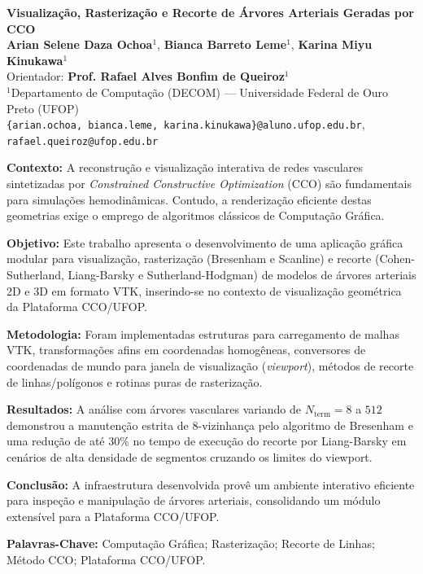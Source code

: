 \documentclass[11pt, a4paper]{article}
\begin{document}
\begin{center}
  {\LARGE \bfseries \textcolor{ufopred}{Visualização, Rasterização e Recorte de Árvores Arteriais Geradas por CCO}}\\[0.4cm]
  {\large \textbf{Arian Selene Daza Ochoa}$^{1}$, \textbf{Bianca Barreto Leme}$^{1}$, \textbf{Karina Miyu Kinukawa}$^{1}$}\\[0.1cm]
  {\small Orientador: \textbf{Prof. Rafael Alves Bonfim de Queiroz}$^{1}$}\\[0.2cm]
  {\small $^{1}$Departamento de Computação (DECOM) --- Universidade Federal de Ouro Preto (UFOP)\\[0.1cm]
  \texttt{\{arian.ochoa, bianca.leme, karina.kinukawa\}@aluno.ufop.edu.br}, \texttt{rafael.queiroz@ufop.edu.br}}\\[0.4cm]
\end{center}

\begin{tcolorbox}[colback=lightgray, colframe=deepnavy, arc=3pt, title=\textbf{RESUMO}, fonttitle=\bfseries]
\small
\textbf{Contexto:} A reconstrução e visualização interativa de redes vasculares sintetizadas por \textit{Constrained Constructive Optimization} (CCO) são fundamentais para simulações hemodinâmicas. Contudo, a renderização eficiente destas geometrias exige o emprego de algoritmos clássicos de Computação Gráfica. 

\textbf{Objetivo:} Este trabalho apresenta o desenvolvimento de uma aplicação gráfica modular para visualização, rasterização (Bresenham e Scanline) e recorte (Cohen-Sutherland, Liang-Barsky e Sutherland-Hodgman) de modelos de árvores arteriais 2D e 3D em formato VTK, inserindo-se no contexto de visualização geométrica da Plataforma CCO/UFOP.

\textbf{Metodologia:} Foram implementadas estruturas para carregamento de malhas VTK, transformações afins em coordenadas homogêneas, conversores de coordenadas de mundo para janela de visualização (\textit{viewport}), métodos de recorte de linhas/polígonos e rotinas puras de rasterização.

\textbf{Resultados:} A análise com árvores vasculares variando de $N_{\text{term}} = 8$ a $512$ demonstrou a manutenção estrita de 8-vizinhança pelo algoritmo de Bresenham e uma redução de até 30\% no tempo de execução do recorte por Liang-Barsky em cenários de alta densidade de segmentos cruzando os limites do viewport.

\textbf{Conclusão:} A infraestrutura desenvolvida provê um ambiente interativo eficiente para inspeção e manipulação de árvores arteriais, consolidando um módulo extensível para a Plataforma CCO/UFOP.

\vspace{0.2cm}
\textbf{Palavras-Chave:} Computação Gráfica; Rasterização; Recorte de Linhas; Método CCO; Plataforma CCO/UFOP.
\end{tcolorbox}
\end{document}
